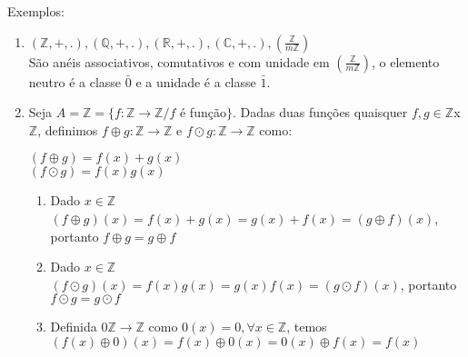 Exemplos:
\begin{enumerate}
\item $(\mathbb{Z},+,.),(\mathbb{Q},+,.),(\mathbb{R},+,.),(\mathbb{C},+,.),\left(\displaystyle\frac{\mathbb{Z}}{m\mathbb{Z}}\right)$\\
S{\~a}o an{\'e}is associativos, comutativos e com unidade em $\left(\displaystyle\frac{\mathbb{Z}}{m\mathbb{Z}}\right)$, o elemento neutro {\'e} a classe $\bar{0}$ e a unidade {\'e} a classe $\bar{1}$.
\item  Seja $A=\mathbb{Z}=\{f:\mathbb{Z}\rightarrow\mathbb{Z}/f$ {\'e} fun{\c c}{\~a}o$\}$. Dadas duas fun{\c c}{\~o}es quaisquer $f,g\in\mathbb{Z}$x$\mathbb{Z}$, definimos $f\oplus g:\mathbb{Z}\rightarrow\mathbb{Z}$ e $f\odot g:\mathbb{Z}\rightarrow\mathbb{Z}$ como:


$(f\oplus g)=f(x)+g(x)$\\
$(f\odot g)=f(x)g(x)$
\begin{enumerate}
\item Dado $x\in\mathbb{Z}$\\
$(f\oplus g)(x)=f(x)+g(x)=g(x)+f(x)=(g\oplus f)(x)$, portanto $f\oplus g=g\oplus f$
\item Dado $x\in\mathbb{Z}$\\
$(f\odot g)(x)=f(x)g(x)=g(x)f(x)=(g\odot f)(x)$, portanto $f\odot g=g\odot f$
\item Definida $0\mathbb{Z}\rightarrow\mathbb{Z}$ como $0(x)=0,\forall x\in\mathbb{Z}$, temos\\
$(f(x)\oplus 0)(x)=f(x)\oplus 0(x)=0(x)\oplus f(x)=f(x)$

\end{enumerate}
\end{enumerate}

